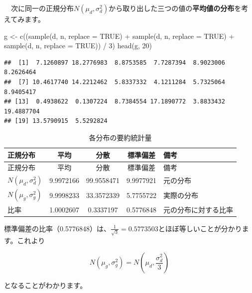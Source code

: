 \documentclass[]{tufte-handout}
\newenvironment{Shaded}{}{}
\newcommand{\AttributeTok}[1]{\textcolor[rgb]{0.49,0.56,0.16}{#1}}
\newcommand{\ConstantTok}[1]{\textcolor[rgb]{0.53,0.00,0.00}{#1}}
\newcommand{\DecValTok}[1]{\textcolor[rgb]{0.25,0.63,0.44}{#1}}
\newcommand{\FunctionTok}[1]{\textcolor[rgb]{0.02,0.16,0.49}{#1}}
\newcommand{\NormalTok}[1]{#1}
\newcommand{\OtherTok}[1]{\textcolor[rgb]{0.00,0.44,0.13}{#1}}
\newcommand{\SpecialCharTok}[1]{\textcolor[rgb]{0.25,0.44,0.63}{#1}}
\begin{document}
　次に同一の正規分布\(N(\mu_d, \sigma^2_d)\)から取り出した三つの値の\textbf{平均値の分布}を考えてみます。
　

\begin{Shaded}
\begin{Highlighting}[numbers=left,,]
\NormalTok{g }\OtherTok{\textless{}{-}} \FunctionTok{c}\NormalTok{((}\FunctionTok{sample}\NormalTok{(d, n, }\AttributeTok{replace =} \ConstantTok{TRUE}\NormalTok{) }\SpecialCharTok{+} \FunctionTok{sample}\NormalTok{(d, n, }\AttributeTok{replace =} \ConstantTok{TRUE}\NormalTok{) }
        \SpecialCharTok{+} \FunctionTok{sample}\NormalTok{(d, n, }\AttributeTok{replace =} \ConstantTok{TRUE}\NormalTok{)) }\SpecialCharTok{/} \DecValTok{3}\NormalTok{)}
\FunctionTok{head}\NormalTok{(g, }\DecValTok{20}\NormalTok{)}
\end{Highlighting}
\end{Shaded}

\begin{verbatim}
##  [1]  7.1260897 18.2776983  8.8753585  7.7287394  8.9023006  8.2626464
##  [7] 10.4617740 14.2212462  5.8337332  4.1211284  5.7325064  8.9405417
## [13]  0.4938622  0.1307224  8.7384554 17.1890772  3.8833432 19.4887704
## [19] 13.5790915  5.5292824
\end{verbatim}

\begin{longtable}[]{@{}lcccl@{}}
\caption{各分布の要約統計量}\tabularnewline
\toprule
正規分布 & 平均 & 分散 & 標準偏差 & 備考 \\
\midrule
\endfirsthead
\toprule
正規分布 & 平均 & 分散 & 標準偏差 & 備考 \\
\midrule
\endhead
\(N(\mu_d, \sigma^2_d)\) & 9.9972166 & 99.9558471 & 9.9977921 &
元の分布 \\
\(N(\mu_g, \sigma^2_g)\) & 9.9998233 & 33.3572339 & 5.7755722 &
実際の分布 \\
比率 & 1.0002607 & 0.3337197 & 0.5776848 & 元の分布に対する比率 \\
\bottomrule
\end{longtable}

標準偏差の比率（0.5776848）は、\(\frac{1}{\sqrt{3}} = 0.5773503\)とほぼ等しいことが分かります。これより

\[N(\mu_g, \sigma^2_g) = N(\mu_d, \frac{\sigma^2_d}{3})\]

となることがわかります。
\end{document}
